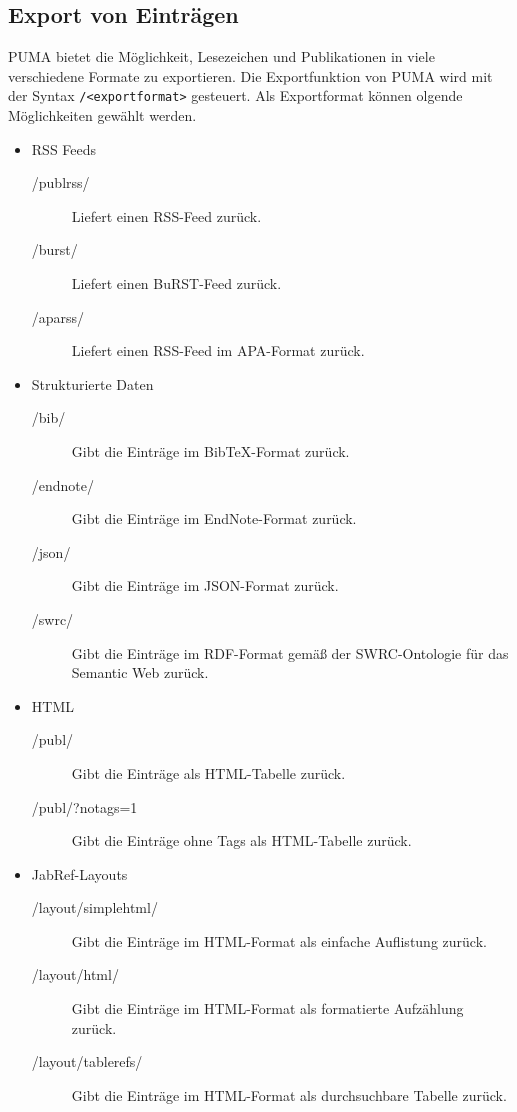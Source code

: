 \subsection{Export von Einträgen}
\label{subsec:export}
PUMA bietet die Möglichkeit, Lesezeichen und Publikationen in viele verschiedene Formate zu exportieren.
Die Exportfunktion von PUMA wird mit der Syntax \texttt{/<exportformat>} gesteuert. Als Exportformat können olgende Möglichkeiten gewählt werden.

\begin{itemize}
    \item RSS Feeds
    \begin{description}
        \item [/publrss/] Liefert einen RSS-Feed zurück.
        \item [/burst/]  Liefert einen BuRST-Feed zurück.
        \item [/aparss/] Liefert einen RSS-Feed im APA-Format zurück.
    \end{description}
    \item Strukturierte Daten
    \begin{description}
        \item [/bib/] Gibt die Einträge im BibTeX-Format zurück.
        \item [/endnote/] Gibt die Einträge im EndNote-Format zurück.
        \item[/json/] Gibt die Einträge im JSON-Format zurück.
        \item[/swrc/] Gibt die Einträge im  RDF-Format gemäß der SWRC-Ontologie für das Semantic Web zurück.
    \end{description}
    \item HTML
    \begin{description}
        \item [/publ/] Gibt die Einträge als HTML-Tabelle zurück.
        \item [/publ/?notags=1] Gibt die Einträge ohne Tags als HTML-Tabelle zurück.
    \end{description}
  \item JabRef-Layouts
    \begin{description}
  \item[/layout/simplehtml/] Gibt die Einträge im HTML-Format als einfache Auflistung zurück.
  \item[/layout/html/] Gibt die Einträge im HTML-Format als formatierte Aufzählung zurück.
  \item[/layout/tablerefs/] Gibt die Einträge im HTML-Format als durchsuchbare Tabelle zurück.

\end{description}
\end{itemize}
